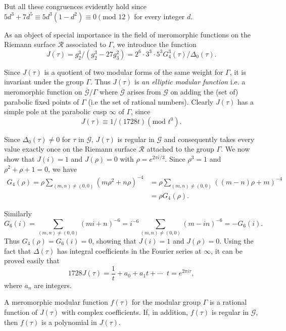 But all these congruences evidently hold since $5d^3+7d^5 \equiv
5d^3(1-d^2) \equiv 0(\text{mod } 12)$ for every integer $d$.

As an object of special importance in the field of meromorphic
functions on the Riemann surface $\mathscr{R}$ associated to $\Gamma$,
we introduce the function
$$
J (\tau) = g^3_2/(g^3_2-27g^2_3) = 2^6 \cdot 3^3\cdot 5^3
G^3_4(\tau)/\Delta_0(\tau). 
$$

Since $J(\tau)$ is a quotient of two modular forms of the same weight
for $\Gamma$, it is invariant under the group $\Gamma$. Thus $J(\tau)$
is \textit{an elliptic modular function} i.e. a meromorphic function
on $\overline{\mathscr{G}}/\Gamma$ where $\overline{\mathscr{G}}$
arises from $\mathscr{G}$ on adding the (set of) parabolic fixed
points of $\Gamma$ (i.e the set of rational numbers). Clearly
$J(\tau)$ has a simple pole at the parabolic cusp $\infty$ of
$\Gamma$, since 
$$
J(\tau) \equiv 1/(1728 t) (\text{mod } t^0). 
$$

Since \pageoriginale $\Delta_0(\tau) \neq 0$ for $\tau$ in
$\mathscr{G}$, $J(\tau)$ is regular in $\mathscr{G}$ and consequently
takes every value exactly once on the Riemann surface $\mathscr{R}$
attached to the group $\Gamma$. We now show that $J(i)=1$ and
$J(\rho)=0$ with $\rho=e^{2\pi i /3}$. Since $\rho^3 =1$ and
$\rho^2+\rho+1=0$, we have 
\begin{align*}
G_4(\rho) = \rho \sum\limits_{(m,n) \neq (0,0)} 
(m\rho^2+n\rho)^{-4} & = \rho
\sum_{(m,n) \neq (0,0)} ((m-n)\rho+m)^{-4}\\
& = \rho G_4 (\rho).
\end{align*}

Similarly
$$
G_6(i) = \sum_{(m,n)\neq (0,0)} (mi+n)^{-6} = i^{-6} \sum_{(m,n)\neq
  (0,0)} (m-in)^{-6} = -G_6(i).
$$
Thus $G_4(\rho)=G_6(i)=0$, showing that $J(i)=1$ and
$J(\rho)=0$. Using the fact that $\Delta(\tau)$ has integral
coefficients in the Fourier series at $\infty$, it can be proved
easily that
$$
1728 J(\tau) = \frac{1}{t} + a_0 + a_1 t 
+ \cdots \;\; t =e^{2\pi i \tau},
$$
where $a_n$ are integers.

\begin{thm}\label{chap2:thm13}
A meromorphic modular function $f(\tau)$ for the modular group
$\Gamma$ is a rational function of $J(\tau)$ with complex
coefficients. If, in addition, $f(\tau)$ is regular in $\mathscr{G}$,
then $f(\tau)$ is a polynomial in $J(\tau)$.
\end{thm}

